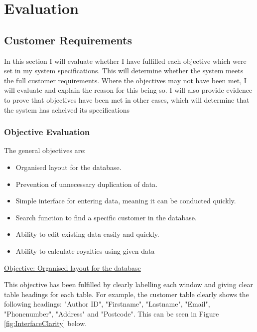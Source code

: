 \chapter{Evaluation}

\section{Customer Requirements}

In this section I will evaluate whether I have fulfilled each objective which were set in my system specifications. This will determine whether the system meets the full customer requirements. Where the objectives may not have been met, I will evaluate and explain the reason for this being so. I will also provide evidence to prove that objectives have been met in other cases, which will determine that the system has acheived its specifications

\subsection{Objective Evaluation}

The general objectives are:
\begin{itemize}
    \item Organised layout for the database.
    \item Prevention of unnecessary duplication of data.
    \item Simple interface for entering data, meaning it can be conducted quickly.
    \item Search function to find a specific customer in the database.
    \item Ability to edit existing data easily and quickly.
    \item Ability to calculate royalties using given data
\end{itemize}

\underline{Objective: Organised layout for the database}

This objective has been fulfilled by clearly labelling each window and giving clear table headings for each table. For example, the customer table clearly shows the following headings: "Author ID", "Firstname", "Lastname", "Email", "Phonenumber", "Address" and "Postcode". This can be seen in Figure \ref{fig:InterfaceClarity} below.

